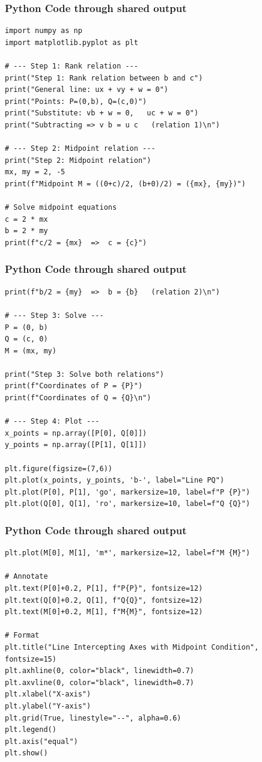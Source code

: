 \documentclass{beamer}
\begin{document}
 \begin{frame}[fragile]
	\frametitle{Python Code through shared output}
	\begin{lstlisting}       
import numpy as np
import matplotlib.pyplot as plt

# --- Step 1: Rank relation ---
print("Step 1: Rank relation between b and c")
print("General line: ux + vy + w = 0")
print("Points: P=(0,b), Q=(c,0)")
print("Substitute: vb + w = 0,   uc + w = 0")
print("Subtracting => v b = u c   (relation 1)\n")

# --- Step 2: Midpoint relation ---
print("Step 2: Midpoint relation")
mx, my = 2, -5
print(f"Midpoint M = ((0+c)/2, (b+0)/2) = ({mx}, {my})")

# Solve midpoint equations
c = 2 * mx
b = 2 * my
print(f"c/2 = {mx}  =>  c = {c}")
   \end{lstlisting}
        \end{frame}
         \begin{frame}[fragile]
	\frametitle{Python Code through shared output}
	\begin{lstlisting}    
print(f"b/2 = {my}  =>  b = {b}   (relation 2)\n")

# --- Step 3: Solve ---
P = (0, b)
Q = (c, 0)
M = (mx, my)

print("Step 3: Solve both relations")
print(f"Coordinates of P = {P}")
print(f"Coordinates of Q = {Q}\n")

# --- Step 4: Plot ---
x_points = np.array([P[0], Q[0]])
y_points = np.array([P[1], Q[1]])

plt.figure(figsize=(7,6))
plt.plot(x_points, y_points, 'b-', label="Line PQ")
plt.plot(P[0], P[1], 'go', markersize=10, label=f"P {P}")
plt.plot(Q[0], Q[1], 'ro', markersize=10, label=f"Q {Q}")
 \end{lstlisting}
        \end{frame}
              \begin{frame}[fragile]
	\frametitle{Python Code through shared output}
	\begin{lstlisting}    
plt.plot(M[0], M[1], 'm*', markersize=12, label=f"M {M}")

# Annotate
plt.text(P[0]+0.2, P[1], f"P{P}", fontsize=12)
plt.text(Q[0]+0.2, Q[1], f"Q{Q}", fontsize=12)
plt.text(M[0]+0.2, M[1], f"M{M}", fontsize=12)

# Format
plt.title("Line Intercepting Axes with Midpoint Condition", fontsize=15)
plt.axhline(0, color="black", linewidth=0.7)
plt.axvline(0, color="black", linewidth=0.7)
plt.xlabel("X-axis")
plt.ylabel("Y-axis")
plt.grid(True, linestyle="--", alpha=0.6)
plt.legend()
plt.axis("equal")
plt.show()

\end{lstlisting}
        \end{frame}
\end{document}
